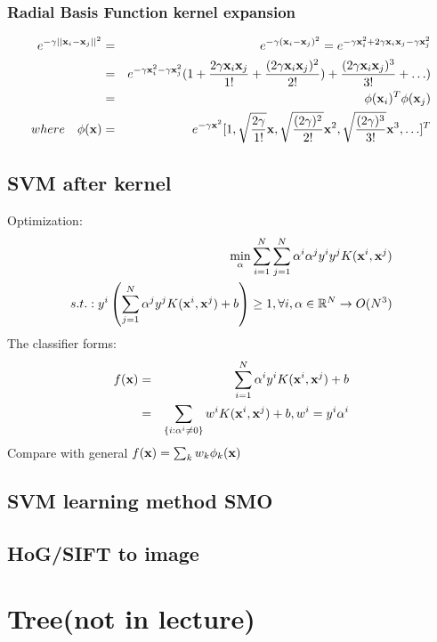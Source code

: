 \documentclass[12pt,a4paper]{article}
\begin{document}
\subsubsection*{Radial Basis Function kernel expansion}
\begin{eqnarray*}
e^{-\gamma||{\bf x}_i-{\bf x}_j||^2} &=& e^{-\gamma({\bf x}_i-{\bf x}_j)^2} = e^{-\gamma{\bf x}_i^2+2\gamma{\bf x}_i{\bf x}_j-\gamma{\bf x}_j^2}\\
&=& e^{-\gamma{\bf x}_i^2-\gamma{\bf x}_j^2}(1+\frac{2\gamma{\bf x}_i{\bf x}_j}{1!}+\frac{(2\gamma{\bf x}_i{\bf x}_j)^2}{2!})+\frac{(2\gamma{\bf x}_i{\bf x}_j)^3}{3!}+\ldots) \\
&=& \phi({\bf x}_i)^T\phi({\bf x}_j)\\
where\quad \phi({\bf x}) &=& e^{-\gamma{\bf x}^2}[1,\sqrt{\frac{2\gamma}{1!}}{\bf x},\sqrt{\frac{(2\gamma)^2}{2!}}{\bf x}^2,\sqrt{\frac{(2\gamma)^3}{3!}}{\bf x}^3,\ldots]^T
\end{eqnarray*}
\subsection*{SVM after kernel}
Optimization:
\begin{eqnarray*}
\min_\alpha\sum_{i=1}^N\sum_{j=1}^N\alpha^i\alpha^jy^iy^jK({\bf x}^i,{\bf x}^j)\\
s.t.: y^i\left(\sum_{j=1}^N\alpha^jy^jK({\bf x}^i,{\bf x}^j)+b\right)\ge 1, \forall i, {\bf \alpha}\in \mathbb{R}^N\rightarrow O(N^3)
\end{eqnarray*}
The classifier forms:
\begin{eqnarray*}
f({\bf x}) &=& \sum_{i=1}^N\alpha^iy^iK({\bf x}^i,{\bf x}^j)+b\\
&=& \sum_{\{i:\alpha^i\ne0\}}w^iK({\bf x}^i,{\bf x}^j)+b, w^i = y^i\alpha^i
\end{eqnarray*}
Compare with general $f({\bf x}) = \sum_kw_k\phi_k({\bf x})$


\subsection*{SVM learning method SMO}

\subsection*{HoG/SIFT to image}




\section*{Tree(not in lecture)}
\end{document}
